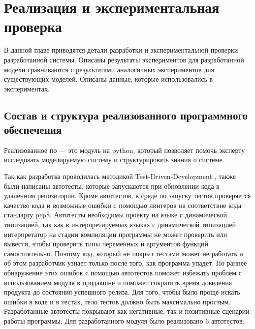 \chapter{Реализация и экспериментальная проверка}

\begin{annotation}
	В данной главе приводятся детали разработки и экспериментальной проверки
	разработанной системы. Описаны результаты экспериментов для разработанной
	модели сравниваются с результатами аналогичных экспериментов для существующих моделей.
	Описаны данные, которые использовались в экспериментах.
\end{annotation}


\section{Состав и структура реализованного программного обеспечения}

Реализованное по --- это модуль на python, который позволяет помочь эксперту
исследовать моделируемую систему и структурировать знания о системе.

Так как разработка проводилась методикой Test-Driven-Development \cite{beck2003test_tdd} \cite{janzen2005test},
также были написаны автотесты, которые запускаются
при обновлении кода в удаленном репозитории. Кроме автотестов,
в среде по запуску тестов проверяется качество кода и возможные ошибки
с помощью линтеров на соответствие кода стандарту pep8.
Автотесты необходимы проекту на языке с динамической типизацией,
так как в интерпретируемых языках с динамической типизацией
интерпретатор на стадии компиляции программы не может проверить или вывести, чтобы проверить
типы переменных и аргументов функций самостоятельно. Поэтому код, который
не покрыт тестами может не работать и об этом разработчик узнает
только после того, как программа упадет. Но раннее обнаружение этих
ошибок с помощью автотестов поможет избежать проблем с использованием модуля в
продакшне и поможет сократить время доведения продукта до состояния успешного релиза.
Для того, чтобы было проще искать ошибки в коде и в тестах,
тело тестов должно быть максимально простым.
Разработанные автотесты покрывают как негативные, так и позитивные
сценарии работы программы.
Для разработанного модуля было реализовано 6 автотестов:

